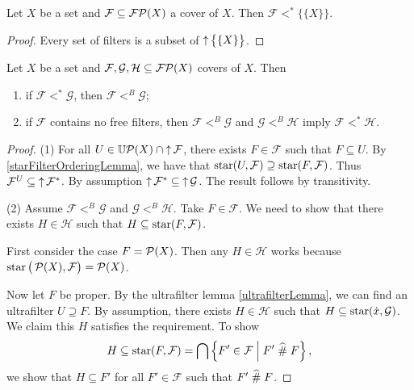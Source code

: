 \begin{lemma}
Let $X$ be a set and $\mathcal{F}\subseteq \operatorname{\mathcal{FP}}(X)$ a cover of $X$. Then $\mathcal{F} <^* \big\{\{X\}\big\}$.
\end{lemma}
\begin{proof}
Every set of filters is a subset of $\operatorname{\uparrow} \big\{\{X\}\big\}$.
\end{proof}

\begin{proposition}
Let $X$ be a set and $\mathcal{F},\mathcal{G}, \mathcal{H}\subseteq \operatorname{\mathcal{FP}}(X)$ covers of $X$. Then
\begin{enumerate}
\item if $\mathcal{F} <^* \mathcal{G}$, then $\mathcal{F} <^B \mathcal{G}$;
\item if $\mathcal{F}$ contains no free filters, then $\mathcal{F} <^B \mathcal{G}$ and $\mathcal{G} <^B \mathcal{H}$ imply $\mathcal{F} <^* \mathcal{H}$.
\end{enumerate}
\end{proposition}
\begin{proof}
(1) For all $U\in \operatorname{\mathbb{U}\mathcal{P}}(X) \cap \operatorname{\uparrow}\mathcal{F}$, there exists $F\in \mathcal{F}$ such that $F\subseteq U$. By \ref{starFilterOrderingLemma}, we have that $\operatorname{star}(U,\mathcal{F}) \supseteq \operatorname{star}(F, \mathcal{F})$. Thus $\mathcal{F}^U \subseteq \operatorname{\uparrow}\mathcal{F}^*$. By assumption $\operatorname{\uparrow} \mathcal{F}^* \subseteq \operatorname{\uparrow}\mathcal{G}$. The result follows by transitivity.

(2) Assume $\mathcal{F} <^B \mathcal{G}$ and $\mathcal{G} <^B \mathcal{H}$. Take $F\in\mathcal{F}$. We need to show that there exists $H\in \mathcal{H}$ such that $H \subseteq \operatorname{star}(F,\mathcal{F})$.

First consider the case $F = \operatorname{\mathcal{P}}(X)$. Then any $H\in \mathcal{H}$ works because $\operatorname{star}\big(\operatorname{\mathcal{P}}(X), \mathcal{F}\big) = \operatorname{\mathcal{P}}(X)$.

Now let $F$ be proper. By the ultrafilter lemma \ref{ultrafilterLemma}, we can find an ultrafilter $U\supseteq F$. By assumption, there exists $H\in \mathcal{H}$ such that $H \subseteq \operatorname{star}(\dot{x}, \mathcal{G})$. We claim this $H$ satisfies the requirement. To show
\[ H \subseteq \operatorname{star}(F,\mathcal{F}) = \bigcap\left\{ F'\in \mathcal{F} \;\middle|\; F'\mathrel{\widehat{\#}} F \right\}, \]
we show that $H\subseteq F'$ for all $F'\in \mathcal{F}$ such that $F'\mathrel{\widehat{\#}} F$.
\end{proof}

